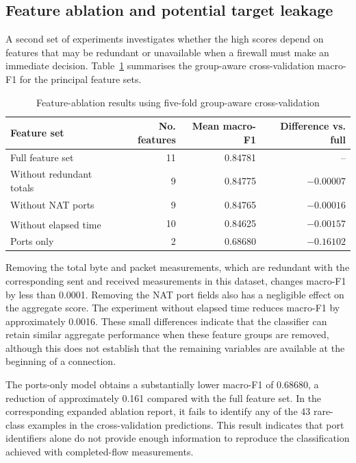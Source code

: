 \subsection{Feature ablation and potential target leakage}

A second set of experiments investigates whether the high scores depend on features that may be redundant or unavailable when a firewall must make an immediate decision. Table~\ref{tab:feature-ablation} summarises the group-aware cross-validation macro-F1 for the principal feature sets.

\begin{table}[htbp]
  \centering
  \caption{Feature-ablation results using five-fold group-aware cross-validation}
  \label{tab:feature-ablation}
  \small
  \begin{tabular}{|l|r|r|r|}
    \hline
    \textbf{Feature set} & \textbf{No. features} & \textbf{Mean macro-F1} & \textbf{Difference vs. full} \\
    \hline
    Full feature set & 11 & 0.84781 & -- \\
    Without redundant totals & 9 & 0.84775 & $-0.00007$ \\
    Without NAT ports & 9 & 0.84765 & $-0.00016$ \\
    Without elapsed time  \textsuperscript{}  & 10 & 0.84625 & $-0.00157$ \\
    Ports only & 2 & 0.68680 & $-0.16102$ \\
    \hline
  \end{tabular}
\end{table}

Removing the total byte and packet measurements, which are redundant with the corresponding sent and received measurements in this dataset, changes macro-F1 by less than 0.0001. Removing the NAT port fields also has a negligible effect on the aggregate score. The experiment without elapsed time reduces macro-F1 by approximately 0.0016. These small differences indicate that the classifier can retain similar aggregate performance when these feature groups are removed, although this does not establish that the remaining variables are available at the beginning of a connection.

The ports-only model obtains a substantially lower macro-F1 of 0.68680, a reduction of approximately 0.161 compared with the full feature set. In the corresponding expanded ablation report, it fails to identify any of the 43 rare-class examples in the cross-validation predictions. This result indicates that port identifiers alone do not provide enough information to reproduce the classification achieved with completed-flow measurements.

